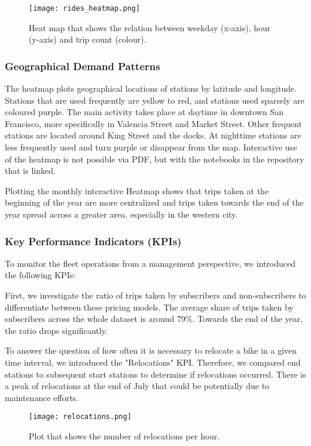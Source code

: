 \begin{figure}[hbtp]
    \centering
    \texttt{[image: rides\_heatmap.png]}
    \caption{Heat map that shows the relation between weekday (x-axis), hour (y-axis) and trip count (colour).}
\end{figure}


\subsubsection{Geographical Demand Patterns}

The heatmap plots geographical locations of stations by latitude and longitude. Stations that are used frequently are yellow to red, and stations used sparsely are coloured purple. The main activity takes place at daytime in downtown San Francisco, more specifically in Valencia Street and Market Street. Other frequent stations are located around King Street and the docks. At nighttime stations are less frequently used and turn purple or disappear from the map. Interactive use of the heatmap is not possible via PDF, but with the notebooks in the repository that is linked. 

Plotting the monthly interactive Heatmap shows that trips taken at the beginning of the year are more centralized and trips taken towards the end of the year spread across a greater area, especially in the western city.

\subsubsection{Key Performance Indicators (KPIs)}

To monitor the fleet operations from a management perspective, we introduced the following KPIs:

First, we investigate the ratio of trips taken by subscribers and non-subscribers to differentiate between these pricing models. The average share of trips taken by subscribers across the whole dataset is around 79\%. Towards the end of the year, the ratio drops significantly. 

To answer the question of how often it is necessary to relocate a bike in a given time interval, we introduced the "Relocations" KPI. Therefore, we compared end stations to subsequent start stations to determine if relocations occurred. There is a peak of relocations at the end of July that could be potentially due to maintenance efforts.

\begin{figure}[hbtp]
    \centering
    \texttt{[image: relocations.png]}
    \caption{Plot that shows the number of relocations per hour.}
\end{figure}



